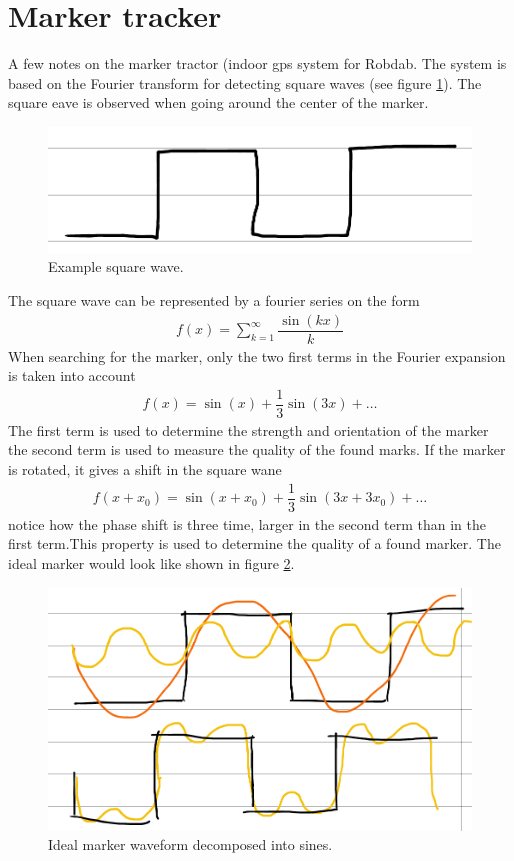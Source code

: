 \documentclass[10pt,a4paper]{article}
\begin{document}
\section{Marker tracker}

A few notes on the marker tractor (indoor
gps system for Robdab.
The system is based on the Fourier transform
for detecting square waves (see figure \ref{figSquareWave}).
The square
eave is observed when going around the
center of the marker.
\begin{figure}
\centering
\includegraphics[width=0.6\linewidth]{pic/squarewave.png}
\caption{Example square wave.}
\label{figSquareWave}
\end{figure}

The square wave can be represented by
a fourier series on the form
\begin{align}
f\left( x\right) =\sum ^{\infty }_{k=1}\dfrac {\sin \left( kx\right) }{k}
\end{align}
When searching for the marker, only the
two first terms in the Fourier expansion
is taken into account 
\begin{align}
f\left( x\right) =\sin \left( x\right) +\dfrac {1}{3}\sin \left( 3x\right) +\ldots
\end{align}
The first term is used to determine the
strength and orientation of the marker
the second term is used to measure
the quality of the found marks.
If the marker is rotated, it gives a
shift in the square wane
\begin{align}
f\left( x+x_{0}\right) =\sin \left( x+x_{0}\right) +\dfrac {1}{3}\sin \left( 3x+3x_{0}\right) +\ldots
\end{align}
notice how the phase shift is three
time, larger in the second term than in
the first term.This property is used to
determine the quality of a found marker.
The ideal marker would look like
shown in figure \ref{figIdealSineDecomposition}.

\begin{figure}[ht]
\centering
\includegraphics[width=0.6\linewidth]{pic/idealmarkerwaveform.png}
\caption{Ideal marker waveform decomposed into sines.}
\label{figIdealSineDecomposition}
\end{figure}
\end{document}
